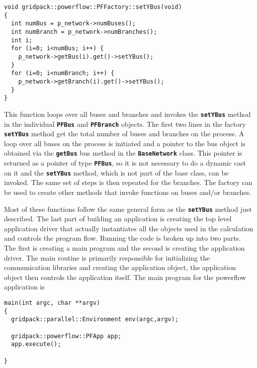 {
\color{red}
\begin{Verbatim}[fontseries=b]
void gridpack::powerflow::PFFactory::setYBus(void)
{
  int numBus = p_network->numBuses();
  int numBranch = p_network->numBranches();
  int i;
  for (i=0; i<numBus; i++) {
    p_network->getBus(i).get()->setYBus();
  }
  for (i=0; i<numBranch; i++) {
    p_network->getBranch(i).get()->setYBus();
  }
}
\end{Verbatim}
}

This function loops over all buses and branches and invokes the \texttt{\textbf{setYBus}} method in the individual \texttt{\textbf{PFBus}} and \texttt{\textbf{PFBranch}} objects. The first two lines in the factory \texttt{\textbf{setYBus}} method get the total number of buses and branches on the process. A loop over all buses on the process is initiated and a pointer to the bus object is obtained via the \texttt{\textbf{getBus}} bus method in the \texttt{\textbf{BaseNetwork}} class. This pointer is returned as a pointer of type \texttt{\textbf{PFBus}}, so it is not necessary to do a dynamic cast on it and the \texttt{\textbf{setYBus}} method, which is not part of the base class, can be invoked. The same set of steps is then repeated for the branches. The factory can be used to create other methods that invoke functions on buses and/or branches. 

Most of these functions follow the same general form as the \texttt{\textbf{setYBus}} method just described.
The last part of building an application is creating the top level application driver that actually instantiates all the objects used in the calculation and controls the program flow. Running the code is broken up into two parts. The first is creating a main program and the second is creating the application driver. The main routine is primarily responsible for initializing the communication libraries and creating the application object, the application object then controls the application itself. The main program for the powerflow application is

{
\color{red}
\begin{Verbatim}[fontseries=b]
main(int argc, char **argv)
{
  gridpack::parallel::Environment env(argc,argv);

  gridpack::powerflow::PFApp app;
  app.execute();

}
\end{Verbatim}
}


